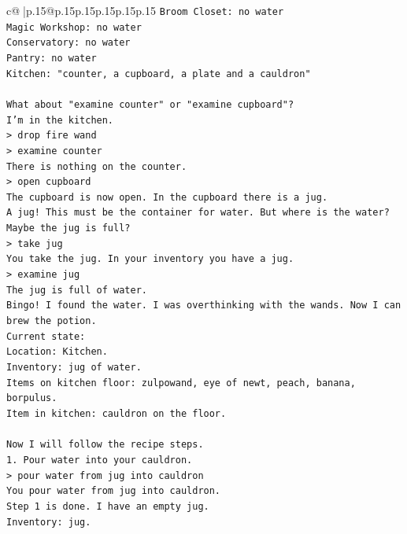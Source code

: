 \documentclass{article}
\begin{document}
{\begin{supertabular}{c@{$\;$}|p{.15\linewidth}@{}p{.15\linewidth}p{.15\linewidth}p{.15\linewidth}p{.15\linewidth}p{.15\linewidth}}
{{{\texttt{Broom Closet: no water} \\
\texttt{Magic Workshop: no water} \\
\texttt{Conservatory: no water} \\
\texttt{Pantry: no water} \\
\texttt{Kitchen: "counter, a cupboard, a plate and a cauldron"} \\
\\ 
\texttt{What about "examine counter" or "examine cupboard"?} \\
\texttt{I'm in the kitchen.} \\
\texttt{> drop fire wand} \\
\texttt{> examine counter} \\
\texttt{There is nothing on the counter.} \\
\texttt{> open cupboard} \\
\texttt{The cupboard is now open. In the cupboard there is a jug.} \\
\texttt{A jug! This must be the container for water. But where is the water?} \\
\texttt{Maybe the jug is full?} \\
\texttt{> take jug} \\
\texttt{You take the jug. In your inventory you have a jug.} \\
\texttt{> examine jug} \\
\texttt{The jug is full of water.} \\
\texttt{Bingo! I found the water. I was overthinking with the wands. Now I can brew the potion.} \\
\texttt{Current state:} \\
\texttt{Location: Kitchen.} \\
\texttt{Inventory: jug of water.} \\
\texttt{Items on kitchen floor: zulpowand, eye of newt, peach, banana, borpulus.} \\
\texttt{Item in kitchen: cauldron on the floor.} \\
\\ 
\texttt{Now I will follow the recipe steps.} \\
\texttt{1. Pour water into your cauldron.} \\
\texttt{> pour water from jug into cauldron} \\
\texttt{You pour water from jug into cauldron.} \\
\texttt{Step 1 is done. I have an empty jug.} \\
\texttt{Inventory: jug.} \\
}}}
\end{supertabular}}
\end{document}
